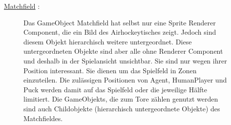 \underline{Matchfield} :

\begin{figure} [h]

\begin{minipage}[t]{0.6\textwidth}
\vspace{0pt}
Das GameObject Matchfield hat selbst nur eine Sprite Renderer Component, die ein Bild des Airhockeytisches zeigt. Jedoch sind diesem Objekt hierarchisch weitere untergeordnet. Diese untergeordneten Objekte sind aber alle ohne Renderer Component und deshalb in der Spielansicht unsichtbar. Sie sind nur wegen ihrer Position interessant. Sie dienen um das Spielfeld in Zonen einzuteilen. Die zulässigen Positionen von Agent, HumanPlayer und Puck werden damit auf das Spielfeld oder die jeweilige Hälfte limitiert. Die GameObjekts, die zum Tore zählen genutzt werden sind auch Childobjekte (hierarchisch untergeordnete Objekte) des Matchfieldes.
\end{minipage}
\hspace{0.1\textwidth}
\begin{minipage}[t]{0.2\textwidth}
\vspace{0pt}

\end{minipage}
\end{figure}
